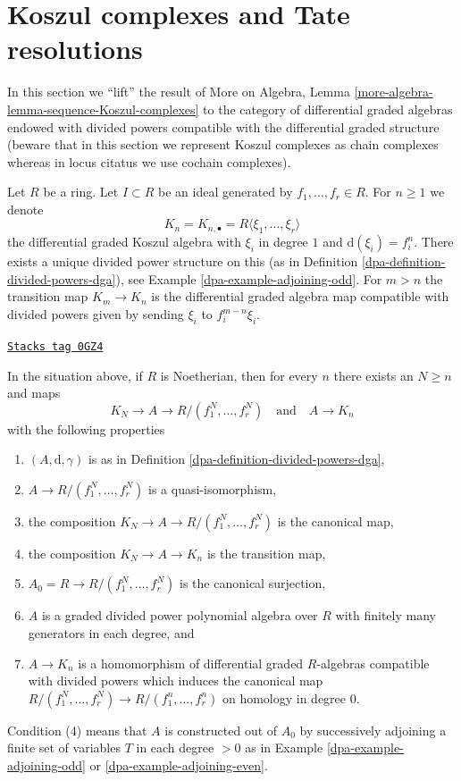 \section{Koszul complexes and Tate resolutions}
\label{dpa-section-koszul-vs-tate}
In this section we ``lift'' the result of
More on Algebra, Lemma \ref{more-algebra-lemma-sequence-Koszul-complexes}
to the category of differential graded algebras endowed with divided
powers compatible with the differential graded structure (beware
that in this section we represent Koszul complexes as chain complexes
whereas in locus citatus we use cochain complexes).

\medskip\noindent
Let $R$ be a ring. Let $I \subset R$ be an ideal generated
by $f_1, \ldots, f_r \in R$. For $n \geq 1$ we denote
$$
K_n = K_{n, \bullet} = R\langle \xi_1, \ldots, \xi_r\rangle
$$
the differential graded Koszul algebra with $\xi_i$ in degree $1$ and
$\text{d}(\xi_i) = f_i^n$. There exists a unique divided power structure on this
(as in Definition \ref{dpa-definition-divided-powers-dga}), see
Example \ref{dpa-example-adjoining-odd}. For $m > n$ the transition map
$K_m \to K_n$ is the differential graded algebra map compatible with
divided powers given by sending $\xi_i$ to $f_i^{m - n}\xi_i$.

\begin{lemma}
\label{dpa-lemma-lift-tate-to-koszul}
\href{https://stacks.math.columbia.edu/tag/0GZ4}{\texttt{Stacks tag 0GZ4}}

In the situation above, if $R$ is Noetherian, then
for every $n$ there exists an $N \geq n$ and maps
$$
K_N \to A \to R/(f_1^N, \ldots, f_r^N)\quad\text{and}\quad A \to K_n
$$
with the following properties
\begin{enumerate}
\item $(A, \text{d}, \gamma)$ is as in
Definition \ref{dpa-definition-divided-powers-dga},
\item $A \to R/(f_1^N, \ldots, f_r^N)$ is a quasi-isomorphism,
\item the composition $K_N \to A \to R/(f_1^N, \ldots, f_r^N)$
is the canonical map,
\item the composition $K_N \to A \to K_n$ is the transition map,
\item $A_0 = R \to R/(f_1^N, \ldots, f_r^N)$ is the canonical
surjection,
\item $A$ is a graded divided power polynomial algebra over $R$
with finitely many generators in each degree, and
\item $A \to K_n$ is a homomorphism of differential graded $R$-algebras
compatible with divided powers which induces the canonical map
$R/(f_1^N, \ldots, f_r^N) \to R/(f_1^n, \ldots, f_r^n)$ on
homology in degree $0$.
\end{enumerate}
Condition (4) means that $A$ is constructed out of $A_0$ by
successively adjoining a finite set of variables $T$ in each degree
$> 0$ as in Example \ref{dpa-example-adjoining-odd} or \ref{dpa-example-adjoining-even}.
\end{lemma}

